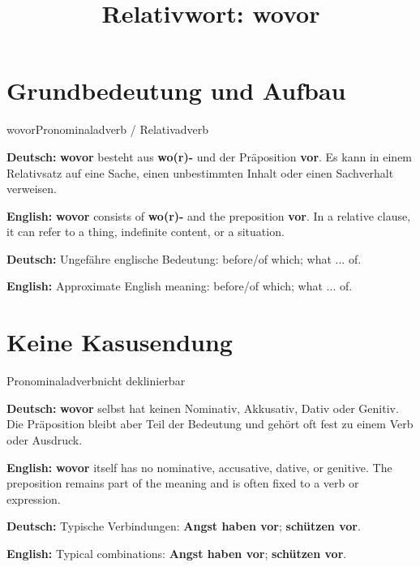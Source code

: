 \documentclass[a4paper,11pt]{article}
\title{Relativwort: \glqq wovor\grqq{}}
\date{}
\newcommand{\GermanText}[1]{\textbf{Deutsch: }#1\par}
\newcommand{\EnglishText}[1]{{\small\color{SoftGray}\textbf{English: }#1\par}}
\begin{document}
\maketitle

\tableofcontents

\newpage

\section{Grundbedeutung und Aufbau}

\begin{grammarentry}{wovor}{Pronominaladverb / Relativadverb}

\GermanText{\textbf{wovor} besteht aus \textbf{wo(r)-} und der Präposition \textbf{vor}. Es kann in einem Relativsatz auf eine Sache, einen unbestimmten Inhalt oder einen Sachverhalt verweisen.}

\EnglishText{\textbf{wovor} consists of \textbf{wo(r)-} and the preposition \textbf{vor}. In a relative clause, it can refer to a thing, indefinite content, or a situation.}

\GermanText{Ungefähre englische Bedeutung: \glqq before/of which; what ... of\grqq{}.}

\EnglishText{Approximate English meaning: \glqq before/of which; what ... of\grqq{}.}

\end{grammarentry}

\section{Keine Kasusendung}

\begin{grammarentry}{Pronominaladverb}{nicht deklinierbar}

\GermanText{\textbf{wovor} selbst hat keinen Nominativ, Akkusativ, Dativ oder Genitiv. Die Präposition bleibt aber Teil der Bedeutung und gehört oft fest zu einem Verb oder Ausdruck.}

\EnglishText{\textbf{wovor} itself has no nominative, accusative, dative, or genitive. The preposition remains part of the meaning and is often fixed to a verb or expression.}

\GermanText{Typische Verbindungen: \textbf{Angst haben vor}; \textbf{schützen vor}.}

\EnglishText{Typical combinations: \textbf{Angst haben vor}; \textbf{schützen vor}.}

\end{grammarentry}
\end{document}
